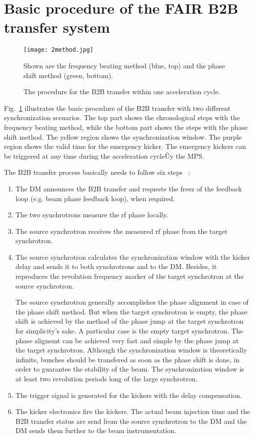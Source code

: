 \section{Basic procedure of the FAIR B2B transfer system}
\begin{figure}[H]
   \centering   
   \texttt{[image: 2method.jpg]}
   \caption{The procedure for the B2B transfer within one acceleration cycle.}{Shown are the frequency beating method (blue, top) and the phase shift method (green, bottom).}
   \label{2method}
\end{figure}
Fig.~\ref{2method} illustrates the basic procedure of the B2B transfer with two different synchronization scenarios. The top part shows the chronological steps with the frequency beating method, while the bottom part shows the steps with the phase shift method. The yellow region shows the synchronization window. The purple region shows the valid time for the emergency kicker. The emergency kickers can be triggered at any time during the acceleration cycleÛy the MPS.  


The B2B transfer process basically needs to follow six steps ~\cite{bai_bunch_2015}:
\begin{enumerate}
\item The DM announces the B2B transfer and requests the freez of the feedback loop (e.g. beam phase feedback loop), when required.
\item The two synchrotrons measure the rf phase locally.
\item The source synchrotron receives the measured rf phase from the target synchrotron.
\item The source synchrotron calculates the synchronization window with the kicker delay and sends it to both synchrotrons and to the DM. Besides, it reproduces the revolution frequency marker of the target synchrotron at the source synchrotron.

The source synchrotron generally accomplishes the phase alignment in case of the phase shift method. But when the target synchrotron is empty, the phase shift is achieved by the method of the phase jump at the target synchrotron for simplicity's sake. A particular case is the empty target synchrotron. The phase alignemt can be achieved very fast and simple by the phase jump at the target synchrotron. Although the synchronization window is theoretically infinite, bunches should be transfered as soon as the phase shift is done, in order to guarantee the stability of the beam. The synchronization window is at least two revolution periods long of the large synchrotron.
\item The trigger signal is generated for the kickers with the delay compensation.
\item The kicker electronics fire the kickers. The actual beam injection time and the B2B transfer status are send from the source synchrotron to the DM and the DM sends them further to the beam instrumentation.

\end{enumerate}



